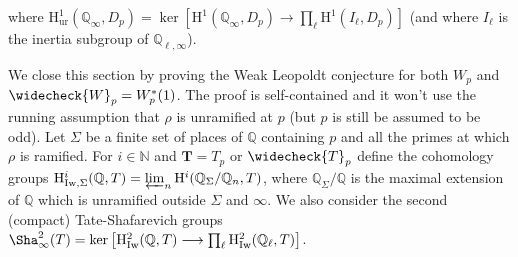 \documentclass[12pt]{amsart}
\newcommand\bN{\mathbb{N}}
\newcommand\bQ{\mathbb{Q}}
\newcommand{\HH}{\mathrm{H}}
\newcommand{\Iw}{\mathrm{Iw}}
\newcommand{\ur}{\mathrm{ur}}
\theoremstyle{defstyle}
\theoremstyle{thmstyle}
\begin{document}
where $\HH^1_\ur(\bQ_\infty,D_p)= \ker\left[\HH^1(\bQ_\infty,D_p) \longrightarrow \prod_\ell \HH^1(I_\ell,D_p)\right]$ (and where $I_\ell$ is the inertia subgroup of $\bQ_{\ell,\infty}$).

We close this section by proving the Weak Leopoldt conjecture for both $W_p$ and $\widecheck{W}_p=W_p^*(1)$. The proof is self-contained and it won't use the running assumption that $\rho$ is unramified at $p$ (but $p$ is still be assumed to be odd). Let $\Sigma$ be a finite set of places of $\bQ$ containing $p$ and all the primes at which $\rho$ is ramified. For $i\in\bN$ and $\textbf{T}=T_p$ or $\widecheck{T}_p$ define the cohomology groups $\HH^i_{\Iw,\Sigma}(\bQ,\textbf{T})=\varprojlim_n \HH^i(\bQ_\Sigma/\bQ_n,\textbf{T})$, where $\bQ_\Sigma/\bQ$ is the maximal extension of $\bQ$ which is unramified outside $\Sigma$ and $\infty$. We also consider the second (compact) Tate-Shafarevich groups  $\Sha_\infty^2(\textbf{T})=\ker \left[\HH^2_\Iw(\bQ,\textbf{T}) \longrightarrow \prod_\ell \HH^2_\Iw(\bQ_{\ell},\textbf{T})\right]$.
\end{document}
